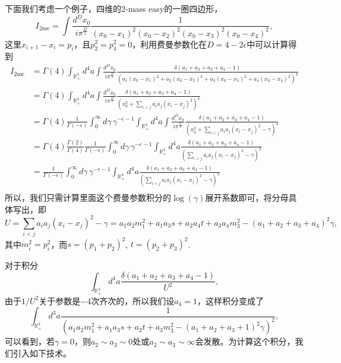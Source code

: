 \documentclass[11pt]{article}
\theoremstyle{definition}
\theoremstyle{plain}
\begin{document}
下面我们考虑一个例子，四维的2-mass easy的一圈四边形，
\[
	I_{\text{2me}}=\int \frac{d^{D} x_0}{i \pi^{\frac{D}{2}}} \frac{1}{(x_0-x_1)^2(x_0-x_2)^2(x_0-x_3)^2(x_0-x_4)^2},
\]
这里$x_{i+1}-x_i=p_i$，且$p_2^2=p_4^2=0$，利用费曼参数化在$D=4-2\epsilon$中可以计算得到
\[
\begin{aligned}
	I_{\text{2me}}&=\Gamma(4)\int_{\mathbb R_+^4}d^4a\int \frac{d^{D} x_0}{i \pi^{\frac{D}{2}}} \frac{\delta(a_1+a_2+a_3+a_4-1)}{(a_1(x_0-x_1)^2+a_2(x_0-x_2)^2+a_3(x_0-x_3)^2+a_4(x_0-x_4)^2)^4}\\
	&=\Gamma(4)\int_{\mathbb R_+^4}d^4a\int \frac{d^{D} x_0}{i \pi^{\frac{D}{2}}} \frac{\delta(a_1+a_2+a_3+a_4-1)}{(x_0^2+\sum_{i<j}a_i a_j (x_i-x_j)^2)^4}\\
	&=\Gamma(4)\frac{1}{\Gamma(-\epsilon)}\int_0^\infty d\gamma \, \gamma^{-\epsilon-1}\int_{\mathbb R_+^4}d^4a\int \frac{d^{D} x_0}{i \pi^{\frac{D}{2}}} \frac{\delta(a_1+a_2+a_3+a_4-1)}{(x_0^2+\sum_{i<j}a_i a_j (x_i-x_j)^2-\gamma)^4}\\
	&=\Gamma(4)\frac{\Gamma(2)}{\Gamma(4)}\frac{1}{\Gamma(-\epsilon)}\int_0^\infty d\gamma \, \gamma^{-\epsilon-1}\int_{\mathbb R_+^4}d^4a\frac{\delta(a_1+a_2+a_3+a_4-1)}{(\sum_{i<j}a_i a_j (x_i-x_j)^2-\gamma)^2}\\
	&=\frac{1}{\Gamma(-\epsilon)}\int_0^\infty d\gamma \, \gamma^{-\epsilon-1}\int_{\mathbb R_+^4}d^4a\frac{\delta(a_1+a_2+a_3+a_4-1)}{(\sum_{i<j}a_i a_j (x_i-x_j)^2-\gamma)^2}\\
\end{aligned}
\]
所以，我们只需计算里面这个费曼参数积分的$\log(\gamma)$展开系数即可，将分母具体写出，即
\[
	U=\sum_{i<j}a_i a_j (x_i-x_j)^2-\gamma=a_1a_2 m_1^2+a_1a_3s+a_2a_4t+a_3a_4m_3^2-(a_1+a_2+a_3+a_4)^2\gamma,
\]
其中$m_i^2=p_i^2$，而$s=(p_1+p_2)^2$, $t=(p_2+p_3)^2$.

对于积分 
\[
	\int_{\mathbb R_+^4}d^4a\frac{\delta(a_1+a_2+a_3+a_4-1)}{U^2},
\]
由于$1/U^2$关于参数是$-4$次齐次的，所以我们设$a_4=1$，这样积分变成了
\[
	\int_{\mathbb R_+^3}d^3a\frac{1}{(a_1a_2 m_1^2+a_1a_3s+a_2t+a_3m_3^2-(a_1+a_2+a_3+1)^2\gamma)^2},
\]
可以看到，若$\gamma=0$，则$a_2\sim a_3\sim 0$处或$a_2\sim a_3\sim \infty$会发散。为计算这个积分，我们引入如下技术。
\end{document}
